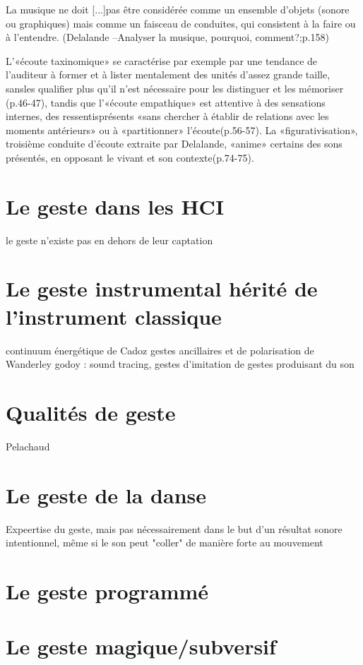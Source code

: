 La musique ne doit [...]pas être considérée comme un ensemble d’objets (sonore ou graphiques) mais comme un faisceau de conduites, qui consistent à la faire ou à l’entendre. (Delalande –Analyser la musique, pourquoi, comment?;p.158) 
 
L’«écoute taxinomique» se caractérise par exemple par une tendance de l’auditeur à former et à lister mentalement des unités d’assez grande taille, sansles qualifier plus qu’il n’est nécessaire pour les distinguer et les mémoriser (p.46-47), tandis que l’«écoute empathique» est attentive à des sensations internes, des ressentisprésents «sans chercher à  établir de relations avec les moments antérieurs» ou à «partitionner» l’écoute(p.56-57). La «figurativisation», troisième conduite d’écoute extraite par Delalande, «anime» certains des sons présentés, en opposant le vivant et son contexte(p.74-75).



\section{Le geste dans les HCI}
	le geste n'existe pas en dehors de leur captation  

\section{Le geste instrumental hérité de l'instrument classique}
	continuum énergétique de Cadoz
	gestes ancillaires et de polarisation de Wanderley
	godoy : sound tracing, gestes d'imitation de gestes produisant du son

\section{Qualités de geste}
Pelachaud 

\section{Le geste de la danse}
Expeertise du geste, mais pas nécessairement dans le but d'un résultat sonore intentionnel, même si le son peut "coller" de manière forte au mouvement


\section{Le geste programmé}


\section{Le geste magique/subversif}

